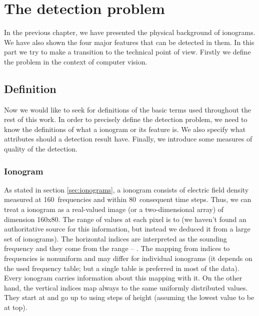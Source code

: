 \chapter{The detection problem}
In the previous chapter, we have presented the physical background of ionograms. We have also shown the four major features that can be detected in them. In this part we try to make a transition to the technical point of view. Firstly we define the problem in the context of computer vision. %

\section{Definition}
Now we would like to seek for definitions of the basic terms used throughout the rest of this work. In order to precisely define the detection problem, we need to know the definitions of what a ionogram or its feature is. We also specify what attributes should a detection result have. Finally, we introduce some measures of quality of the detection.

\subsection{Ionogram}
As stated in section \ref{sec:ionograms}, a ionogram consists of electric field density measured at 160~frequencies and within 80~consequent time steps. Thus, we can treat a ionogram as a real-valued image (or a two-dimensional array) of dimension 160x80. The range of values at each pixel is  to  (we haven't found an authoritative source for this information, but instead we deduced it from a large set of ionograms). The horizontal indices are interpreted as the sounding frequency and they come from the range  -- . The mapping from indices to frequencies is nonuniform and may differ for individual ionograms (it depends on the used frequency table; but a single table is preferred in most of the data). Every ionogram carries information about this mapping with it. On the other hand, the vertical indices map always to the same uniformly distributed values. They start at  and go up to  using steps of height  (assuming the lowest value to be at top). 

